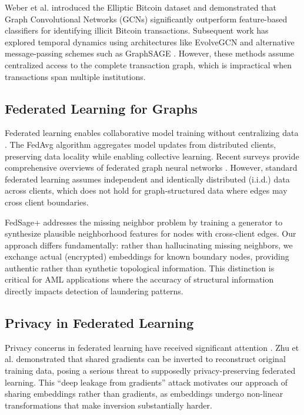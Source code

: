 \documentclass[conference]{IEEEtran}
\begin{document}
Weber et al. \cite{weber2019anti} introduced the Elliptic Bitcoin dataset and demonstrated that Graph Convolutional Networks (GCNs) \cite{kipf2016semi} significantly outperform feature-based classifiers for identifying illicit Bitcoin transactions. Subsequent work has explored temporal dynamics using architectures like EvolveGCN \cite{pareja2020evolvegcn} and alternative message-passing schemes such as GraphSAGE \cite{hamilton2017inductive}. However, these methods assume centralized access to the complete transaction graph, which is impractical when transactions span multiple institutions.

\subsection{Federated Learning for Graphs}
Federated learning enables collaborative model training without centralizing data \cite{mcmahan2017communication}. The FedAvg algorithm aggregates model updates from distributed clients, preserving data locality while enabling collective learning. Recent surveys provide comprehensive overviews of federated graph neural networks \cite{wu2021fedgnn}. However, standard federated learning assumes independent and identically distributed (i.i.d.) data across clients, which does not hold for graph-structured data where edges may cross client boundaries.

FedSage+ \cite{zhang2021fedsage} addresses the missing neighbor problem by training a generator to synthesize plausible neighborhood features for nodes with cross-client edges. Our approach differs fundamentally: rather than hallucinating missing neighbors, we exchange actual (encrypted) embeddings for known boundary nodes, providing authentic rather than synthetic topological information. This distinction is critical for AML applications where the accuracy of structural information directly impacts detection of laundering patterns.

\subsection{Privacy in Federated Learning}
Privacy concerns in federated learning have received significant attention \cite{mothukuri2021survey}. Zhu et al. \cite{zhu2019deep} demonstrated that shared gradients can be inverted to reconstruct original training data, posing a serious threat to supposedly privacy-preserving federated learning. This ``deep leakage from gradients'' attack motivates our approach of sharing embeddings rather than gradients, as embeddings undergo non-linear transformations that make inversion substantially harder.
\end{document}
